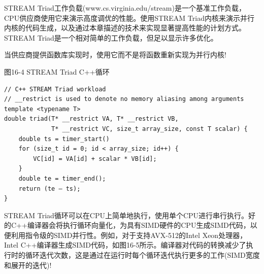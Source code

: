 \begin{tcolorbox}[colback=blue!5!white,colframe=blue!75!black, title=关于STREAM Triad工作负载的解释]
STREAM Triad工作负载(www.cs.virginia.edu/stream)是一个基准工作负载，CPU供应商使用它来演示高度调优的性能。使用STREAM Triad内核来演示并行内核的代码生成，以及通过本章描述的技术来实现显著提高性能的计划方式。STREAM Triad是一个相对简单的工作负载，但足以显示许多优化。
\end{tcolorbox}

\begin{tcolorbox}[colback=blue!5!white,colframe=blue!75!black, title=使用供应商提供的库!]
当供应商提供函数库实现时，使用它而不是将函数重新实现为并行内核!
\end{tcolorbox}

\hspace*{\fill} \par %
图16-4 STREAM Triad C++循环
\begin{lstlisting}[caption={}]
// C++ STREAM Triad workload
// __restrict is used to denote no memory aliasing among arguments 
template <typename T>
double triad(T* __restrict VA, T* __restrict VB, 
			 T* __restrict VC, size_t array_size, const T scalar) {
	double ts = timer_start()
	for (size_t id = 0; id < array_size; id++) {
		VC[id] = VA[id] + scalar * VB[id];
	}
	double te = timer_end();
	return (te – ts); 
}
\end{lstlisting}

STREAM Triad循环可以在CPU上简单地执行，使用单个CPU进行串行执行。好的C++编译器会将执行循环向量化，为具有SIMD硬件的CPU生成SIMD代码，以便利用指令级的SIMD并行性。例如，对于支持AVX-512的Intel Xeon处理器，Intel C++编译器生成SIMD代码，如图16-5所示。编译器对代码的转换减少了执行时的循环迭代次数，这是通过在运行时每个循环迭代执行更多的工作(SIMD宽度和展开的迭代)!\par

